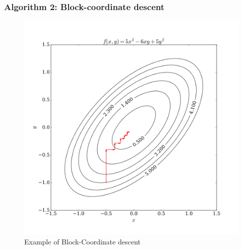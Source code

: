 %

\subsubsection{Algorithm 2: Block-coordinate descent}

\begin{figure}[h]
 \centering
 \includegraphics[scale=0.4]{Coordinate_descent.png}
 \caption{Example of Block-Coordinate descent}
 \label{fig:BlockCoordDescent}
\end{figure}

